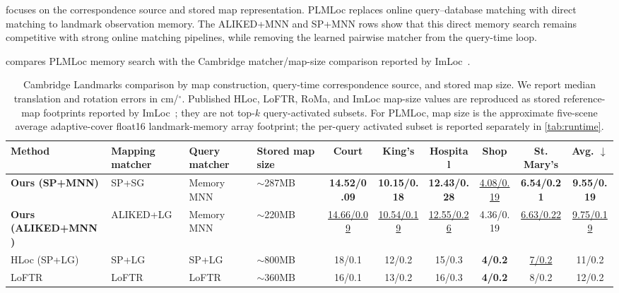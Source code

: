 \documentclass[letterpaper,10 pt,conference]{ieeeconf}
\newcommand{\method}{PLMLoc}
\begin{document}
 focuses on the correspondence source and stored map representation. \method{} replaces online query--database matching with direct matching to landmark observation memory. The ALIKED+MNN and SP+MNN rows show that this direct memory search remains competitive with strong online matching pipelines, while removing the learned pairwise matcher from the query-time loop.


 compares \method{} memory search with the Cambridge matcher/map-size comparison reported by ImLoc~\cite{jiang2026imloc}.

\begin{table}[!t]
    \centering
    \caption{Cambridge Landmarks comparison by map construction, query-time correspondence source, and stored map size. We report median translation and rotation errors in cm/$^\circ$. Published HLoc, LoFTR, RoMa, and ImLoc map-size values are reproduced as stored reference-map footprints reported by ImLoc~\cite{jiang2026imloc}; they are not top-$k$ query-activated subsets. For \method{}, map size is the approximate five-scene average adaptive-cover float16 landmark-memory array footprint; the per-query activated subset is reported separately in \cref{tab:runtime}.}
    \label{tab:cambridge-matcher-split}
    \setlength{\tabcolsep}{2.4pt}
    \begin{adjustbox}{max width=\textwidth}
    \begin{tabular}{@{}llllcccccc@{}}
        \toprule
        Method & Mapping matcher & Query matcher & Stored map size & Court & King's & Hospital & Shop & St. Mary's & Avg. $\downarrow$ \\
        \midrule
        \textbf{Ours (SP+MNN)} & SP+SG & Memory MNN & $\sim$287MB & \textbf{14.52/0.09} & \textbf{10.15/0.18} & \textbf{12.43/0.28} & \underline{4.08/0.19} & \textbf{6.54/0.21} & \textbf{9.55/0.19} \\
        \textbf{Ours (ALIKED+MNN)} & ALIKED+LG & Memory MNN & $\sim$220MB & \underline{14.66/0.09} & \underline{10.54/0.19} & \underline{12.55/0.26} & 4.36/0.19 & \underline{6.63/0.22} & \underline{9.75/0.19} \\
        \midrule
        HLoc (SP+LG)~\cite{sarlin2019hloc,lindenberger2023lightglue} & SP+LG & SP+LG & $\sim$800MB & 18/0.1 & 12/0.2 & 15/0.3 & \textbf{4/0.2} & \underline{7/0.2} & 11/0.2 \\
        LoFTR~\cite{sun2021loftr} & LoFTR & LoFTR & $\sim$360MB & 16/0.1 & 13/0.2 & 16/0.3 & \textbf{4/0.2} & 8/0.2 & 12/0.2 \\

\end{tabular}
\end{adjustbox}
\end{table}
\end{document}
